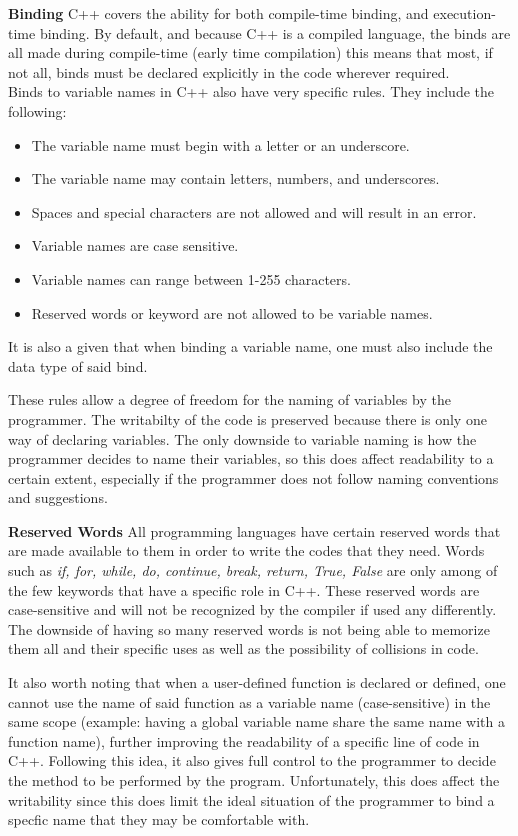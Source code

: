 \documentclass[12pt]{article}
\begin{document}
\textbf{Binding} C++ covers the ability for both compile-time binding, and execution-time binding. By default, and because C++ is a compiled language, the binds are all made during compile-time (early time compilation) this means that most, if not all, binds must be declared explicitly in the code wherever required.\\ Binds to variable names in C++ also have very specific rules. They include the following:
\begin{itemize} \label{Variable name rules}
  \item The variable name must begin with a letter or an underscore.
  \item The variable name may contain letters, numbers, and underscores.
  \item Spaces and special characters are not allowed and will result in an error.
  \item Variable names are case sensitive.
  \item Variable names can range between 1-255 characters.
  \item Reserved words or keyword are not allowed to be variable names.
\end{itemize}
It is also a given that when binding a variable name, one must also include the data type of said bind.

These rules allow a degree of freedom for the naming of variables by the programmer. The writabilty of the code is preserved because there is only one way of declaring variables. The only downside to variable naming is how the programmer decides to name their variables, so this does affect readability to a certain extent, especially if the programmer does not follow naming conventions and suggestions.  

\textbf{Reserved Words} All programming languages have certain reserved words that are made available to them in order to write the codes that they need. Words such as \textit{if, for, while, do, continue, break, return, True, False} are only among of the few keywords that have a specific role in C++. These reserved words are case-sensitive and will not be recognized by the compiler if used any differently. The downside of having so many reserved words is not being able to memorize them all and their specific uses as well as the possibility of collisions in code. 

It also worth noting that when a user-defined function is declared or defined, one cannot use the name of said function as a variable name (case-sensitive) in the same scope (example: having a global variable name share the same name with a function name), further improving the readability of a specific line of code in C++. Following this idea, it also gives full control to the programmer to decide the method to be performed by the program. Unfortunately, this does affect the writability since this does limit the ideal situation of the programmer to bind a specfic name that they may be comfortable with. 
\end{document}
